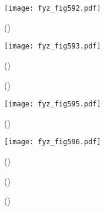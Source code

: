     \begin{figure}[ht!] %
      \centering
      \texttt{[image: fyz\_fig592.pdf]}
      \caption{
               (\cite[s.~707]{Feynman02})}
      \label{fyz:fig592}
    \end{figure}

    \begin{figure}[ht!] %
      \centering
      \texttt{[image: fyz\_fig593.pdf]}
      \caption{
               (\cite[s.~707]{Feynman02})}
      \label{fyz:fig593}
    \end{figure}

    \begin{figure}[ht!]
      \centering
                     \newline
      \caption{
               (\cite[s.~748]{Feynman02})}
    \end{figure}

    \begin{figure}[ht!] %
      \centering
      \texttt{[image: fyz\_fig595.pdf]}
      \caption{
               (\cite[s.~707]{Feynman02})}
      \label{fyz:fig595}
    \end{figure}

    \begin{figure}[ht!] %
      \centering
      \texttt{[image: fyz\_fig596.pdf]}
      \caption{
               (\cite[s.~707]{Feynman02})}
      \label{fyz:fig596}
    \end{figure}

    \begin{figure}[ht!]
      \centering
                     \newline
      \caption{
               (\cite[s.~748]{Feynman02})}
      \label{fyz:fig597}
    \end{figure}

    \begin{figure}[ht!]
      \centering
                     \newline
                     \newline
      \caption{
               (\cite[s.~748]{Feynman02})}
      \label{fyz:fig598}
    \end{figure}

